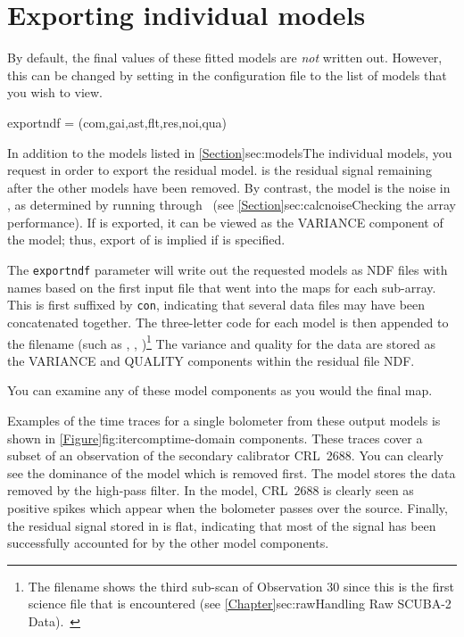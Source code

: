 \section{Exporting individual models}
\label{sec:export}

By default, the final values of these fitted models are \emph{not}
written out. However, this can be changed by setting
 in the configuration file to the list of models
that you wish to view.

\begin{terminalv}
exportndf = (com,gai,ast,flt,res,noi,qua)
\end{terminalv}

In addition to the models listed in \cref{Section}{sec:models}{The
individual models}, you request  in order to export the
residual model.  is the residual signal remaining after
the other models have been removed. By contrast, the 
model is the noise in , as determined by running
 through \calcnoise\ (see
\cref{Section}{sec:calcnoise}{Checking the array performance}). If
 is exported, it can be viewed as the VARIANCE component
of the  model; thus, export of  is implied if
 is specified.


The \texttt{exportndf} parameter will write out the requested models
as NDF files with names based on the first input file that went into
the maps for each sub-array. This is first suffixed by \texttt{con},
indicating that several data files may have been concatenated
together. The three-letter code for each model is then appended to the
filename (such as ,
,
)\footnote{The filename
shows the third sub-scan of Observation 30 since this is the first science
file that is encountered (see \cref{Chapter}{sec:raw}{Handling Raw
SCUBA-2 Data}).~} The variance and quality for the data are stored as
the VARIANCE and QUALITY components within the residual file NDF.

\begin{tip}
  You can examine any of these model components as you would the final
  map.
\end{tip}

Examples of the time traces for a single bolometer from these output
models is shown in \cref{Figure}{fig:itercomp}{time-domain
components}. These traces cover a subset of an observation of the
secondary calibrator CRL~2688. You can clearly see the dominance of the
 model which is removed first. The  model
stores the data removed by the high-pass filter. In the 
model, CRL~2688 is clearly seen as positive spikes which appear when
the bolometer passes over the source. Finally, the residual signal
stored in  is flat, indicating that most of the signal has
been successfully accounted for by the other model components.


